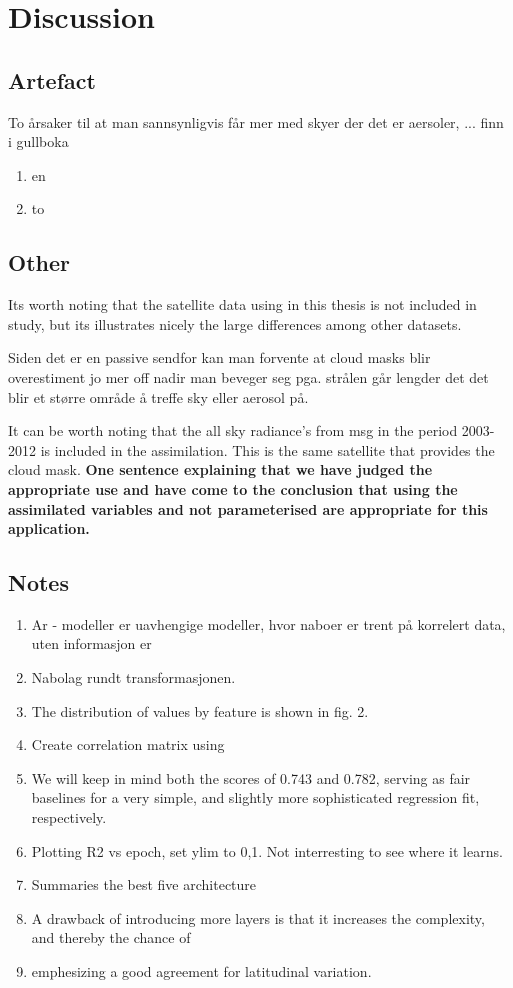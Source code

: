 \chapter{Discussion}
\section{Artefact}
To årsaker til at man sannsynligvis får mer med skyer der det er aersoler,  ... finn i gullboka
\begin{enumerate}
    \item en
    \item to
\end{enumerate}


\section{Other}
Its worth noting that the satellite data using in this thesis is not included in  \citeauthor{Stubenrauch2013AssessmentPanel} study, but its illustrates nicely the large differences among other datasets. 


Siden det er en passive sendfor kan man forvente at cloud masks blir overestiment jo mer off nadir man beveger seg pga. strålen går lengder det det blir et større område å treffe sky eller aerosol på. \citeauthor{Maddux2010ViewingProducts}


It can be worth noting that the all sky radiance's from \acrfull{msg} in the period 2003-2012 is included in the assimilation. This is the same satellite that provides the cloud mask. 
\textbf{One sentence explaining that we have judged the appropriate use and have come to the conclusion that using the assimilated variables and not parameterised are appropriate for this application.}

\section{Notes}
\begin{enumerate}
    \item Ar - modeller er uavhengige modeller, hvor naboer er trent på korrelert data, uten informasjon er
    \item Nabolag rundt transformasjonen. 
    \item The distribution of values
    by feature is shown in fig. 2.
    \item Create correlation matrix using 
    \item We will keep in mind both the scores of 0.743 and 0.782, serving
    as fair baselines for a very simple, and slightly more sophisticated
    regression fit, respectively.
    \item Plotting R2 vs epoch, set ylim to 0,1. Not interresting to see where it learns.
    \item Summaries the best five architecture 
    \item A drawback of introducing more layers
    is that it increases the complexity, and thereby the chance of
    \item emphesizing a good agreement for latitudinal variation.
\end{enumerate}

